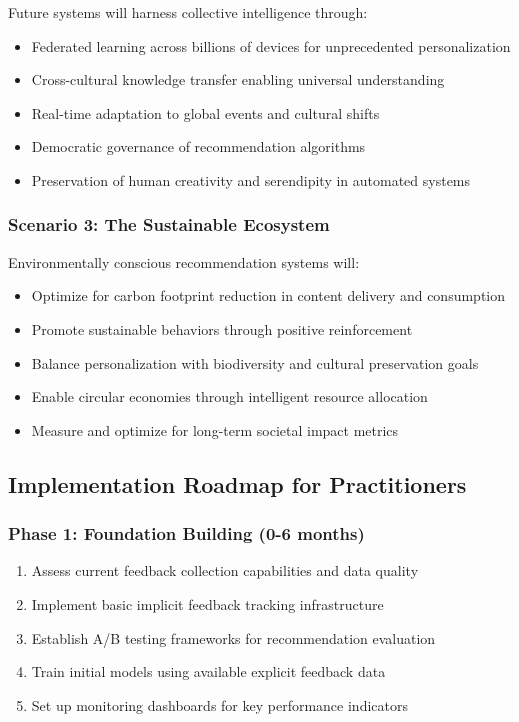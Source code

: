 Future systems will harness collective intelligence through:
\begin{itemize}
    \item Federated learning across billions of devices for unprecedented personalization
    \item Cross-cultural knowledge transfer enabling universal understanding
    \item Real-time adaptation to global events and cultural shifts
    \item Democratic governance of recommendation algorithms
    \item Preservation of human creativity and serendipity in automated systems
\end{itemize}

\subsubsection{Scenario 3: The Sustainable Ecosystem}

Environmentally conscious recommendation systems will:
\begin{itemize}
    \item Optimize for carbon footprint reduction in content delivery and consumption
    \item Promote sustainable behaviors through positive reinforcement
    \item Balance personalization with biodiversity and cultural preservation goals
    \item Enable circular economies through intelligent resource allocation
    \item Measure and optimize for long-term societal impact metrics
\end{itemize}

\subsection{Implementation Roadmap for Practitioners}

\subsubsection{Phase 1: Foundation Building (0-6 months)}

\begin{enumerate}
    \item Assess current feedback collection capabilities and data quality
    \item Implement basic implicit feedback tracking infrastructure
    \item Establish A/B testing frameworks for recommendation evaluation
    \item Train initial models using available explicit feedback data
    \item Set up monitoring dashboards for key performance indicators
\end{enumerate}

